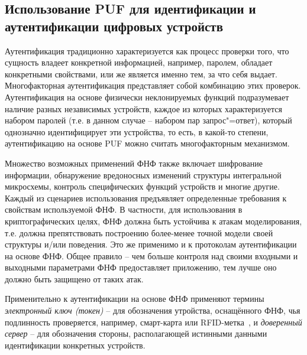 \subsection{Использование PUF для идентификации и аутентификации цифровых устройств}
\label{sub:domain:puf_auth}
Аутентификация традиционно характеризуется как процесс проверки того, что сущность владеет конкретной информацией, например, паролем, обладает конкретными свойствами, или же является именно тем, за что себя выдает. Многофакторная аутентификация представляет собой комбинацию этих проверок. Аутентификация на основе физически неклонируемых функций подразумевает наличие разных независимых устройств, каждое из которых характеризуется набором паролей (т.е. в данном случае -- набором пар запрос"=ответ), который однозначно идентифицирует эти устройства, то есть, в какой-то степени, аутентификацию на основе PUF можно считать многофакторным механизмом.

Множество возможных применений ФНФ также включает шифрование информации, обнаружение вредоносных изменений структуры интегральной микросхемы, контроль специфических функций устройств и многие другие. Каждый из сценариев использования предъявляет определенные требования к свойствам используемой ФНФ. В частности, для использования в криптографических целях, ФНФ должна быть устойчива к атакам моделирования, т.е. должна препятствовать построению более-менее точной модели своей структуры и/или поведения. Это же применимо и к протоколам аутентификации на основе ФНФ. Общее правило -- чем больше контроля над своими входными и выходными параметрами ФНФ предоставляет приложению, тем лучше оно должно быть защищено от таких атак.

Применительно к аутентификации на основе ФНФ применяют термины \emph{электронный ключ (токен)} -- для обозначения утройства, оснащённого ФНФ, чья подлинность проверяется, например, смарт-карта или RFID-метка~\cite{rfid_puf}, и \emph{доверенный сервер} -- для обозначения стороны, располагающей истинными данными идентификации конкретных устройств.

